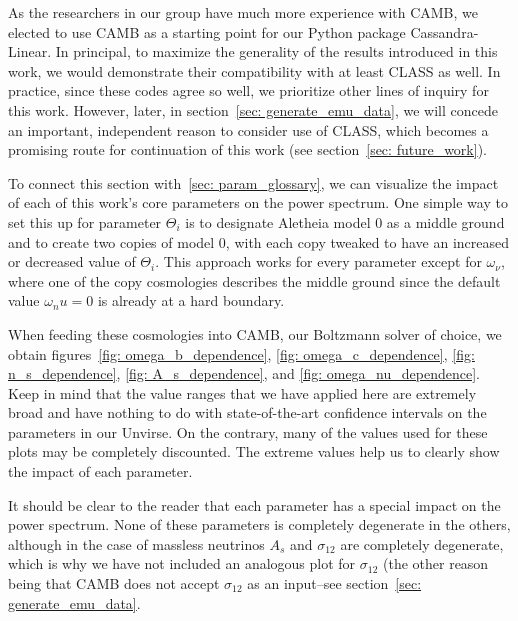 As the researchers in our group have much more experience with CAMB, we 
elected to use CAMB as a starting point for our Python package
Cassandra-Linear. In principal, to maximize the generality of 
the results introduced in this 
work, we would demonstrate their compatibility with at least CLASS as well. In 
practice, since these codes agree so well, we prioritize other lines of 
inquiry
for this work. However, later, in section~\ref{sec: generate_emu_data}, we 
will concede an important, 
independent reason to consider use of CLASS, which becomes a promising route
for continuation of this work (see section~\ref{sec: future_work}).

\begin{comment}
\textcolor{green}{Furthermore, the CLASS documentation
is not nearly as strong as it is with CAMB, and we already encountered
extreme difficulty simply in recreating results already previously obtained
via CAMB!}
\end{comment}


To connect this section with~\ref{sec: param_glossary}, we can visualize the
impact of each of this work's core parameters on the power spectrum. One
simple way to set this up for parameter $\Theta_i$ is to designate Aletheia 
model 0 as a middle ground and to create two copies of model 0, with each
copy tweaked to have an increased or decreased value of $\Theta_i$. This
approach works for every parameter except for $\omega_\nu$, where one of the
copy cosmologies describes the middle ground since the default value
$\omega_nu = 0$ is already at a hard boundary.

When feeding these cosmologies into CAMB, our Boltzmann solver of choice, we
obtain figures~\ref{fig: omega_b_dependence}, \ref{fig: omega_c_dependence}, 
\ref{fig: n_s_dependence}, \ref{fig: A_s_dependence}, and \ref{fig: 
omega_nu_dependence}. Keep in mind that the value ranges that we have applied
here are extremely broad and have nothing to do with state-of-the-art
confidence intervals on the parameters in our Unvirse. On the 
contrary, many of the values used for these plots may be completely 
discounted. The extreme values help us to clearly show the impact of each
parameter.

It should be
clear to the reader that each parameter has a special impact on the power
spectrum. None of these parameters is completely degenerate in the others,
although in the case of massless neutrinos $A_s$ and $\sigma_{12}$ are
completely degenerate, which is why we have not included an analogous plot for
$\sigma_{12}$ (the other reason being that CAMB does not accept $\sigma_{12}$
as an input--see section~\ref{sec: generate_emu_data}.

